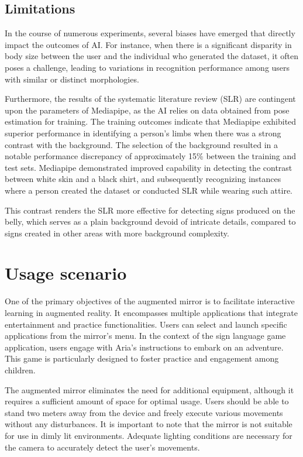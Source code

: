 \subsection{Limitations}

In the course of numerous experiments, several biases have emerged that directly impact the outcomes of AI. For instance, when there is a significant disparity in body size between the user and the individual who generated the dataset, it often poses a challenge, leading to variations in recognition performance among users with similar or distinct morphologies.

Furthermore, the results of the systematic literature review (SLR) are contingent upon the parameters of Mediapipe, as the AI relies on data obtained from pose estimation for training. The training outcomes indicate that Mediapipe exhibited superior performance in identifying a person's limbs when there was a strong contrast with the background. The selection of the background resulted in a notable performance discrepancy of approximately 15\% between the training and test sets. Mediapipe demonstrated improved capability in detecting the contrast between white skin and a black shirt, and subsequently recognizing instances where a person created the dataset or conducted SLR while wearing such attire.

This contrast renders the SLR more effective for detecting signs produced on the belly, which serves as a plain background devoid of intricate details, compared to signs created in other areas with more background complexity.

\section{Usage scenario}

One of the primary objectives of the augmented mirror is to facilitate interactive learning in augmented reality. It encompasses multiple applications that integrate entertainment and practice functionalities. Users can select and launch specific applications from the mirror's menu. In the context of the sign language game application, users engage with Aria's instructions to embark on an adventure. This game is particularly designed to foster practice and engagement among children.

The augmented mirror eliminates the need for additional equipment, although it requires a sufficient amount of space for optimal usage. Users should be able to stand two meters away from the device and freely execute various movements without any disturbances. It is important to note that the mirror is not suitable for use in dimly lit environments. Adequate lighting conditions are necessary for the camera to accurately detect the user's movements.

